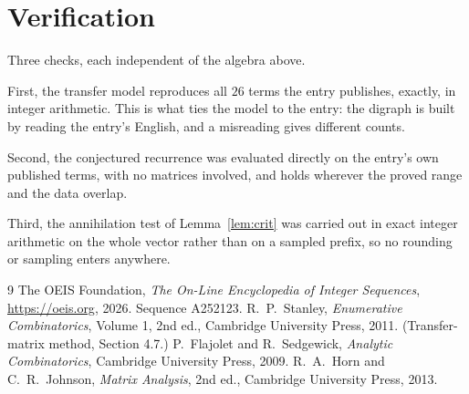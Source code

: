 \documentclass[11pt,a4paper]{article}
\theoremstyle{plain}
\theoremstyle{definition}
\begin{document}
\section{Verification}

Three checks, each independent of the algebra above.

First, the transfer model reproduces all $26$ terms the entry publishes, exactly, in
integer arithmetic. This is what ties the model to the entry: the digraph is built by reading
the entry's English, and a misreading gives different counts.

Second, the conjectured recurrence was evaluated directly on the entry's own published terms,
with no matrices involved, and holds wherever the proved range and the data overlap.

Third, the annihilation test of Lemma~\ref{lem:crit} was carried out in exact integer
arithmetic on the whole vector rather than on a sampled prefix, so no rounding or sampling
enters anywhere.

\begin{thebibliography}{9}
 The OEIS Foundation, \emph{The On-Line Encyclopedia of Integer
Sequences}, \url{https://oeis.org}, 2026. Sequence A252123.
 R.~P.~Stanley, \emph{Enumerative Combinatorics}, Volume 1, 2nd ed.,
Cambridge University Press, 2011. (Transfer-matrix method, Section 4.7.)
 P.~Flajolet and R.~Sedgewick, \emph{Analytic Combinatorics}, Cambridge
University Press, 2009.
 R.~A.~Horn and C.~R.~Johnson, \emph{Matrix Analysis}, 2nd ed., Cambridge
University Press, 2013.
\end{thebibliography}
\end{document}
